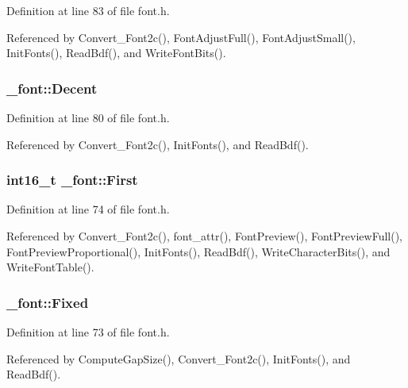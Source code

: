 Definition at line 83 of file font.\-h.



Referenced by Convert\-\_\-\-Font2c(), Font\-Adjust\-Full(), Font\-Adjust\-Small(), Init\-Fonts(), Read\-Bdf(), and Write\-Font\-Bits().

\hypertarget{struct__font_a7f3567884a6aa454b7414b10dba35755}{
\subsubsection[{Decent}]{ \-\_\-font\-::\-Decent}}\label{struct__font_a7f3567884a6aa454b7414b10dba35755}


Definition at line 80 of file font.\-h.



Referenced by Convert\-\_\-\-Font2c(), Init\-Fonts(), and Read\-Bdf().

\hypertarget{struct__font_a73decb2a2c2880dc782cd9cda5561876}{
\subsubsection[{First}]{\setlength{\rightskip}{0pt plus 5cm}int16\-\_\-t \-\_\-font\-::\-First}}\label{struct__font_a73decb2a2c2880dc782cd9cda5561876}


Definition at line 74 of file font.\-h.



Referenced by Convert\-\_\-\-Font2c(), font\-\_\-attr(), Font\-Preview(), Font\-Preview\-Full(), Font\-Preview\-Proportional(), Init\-Fonts(), Read\-Bdf(), Write\-Character\-Bits(), and Write\-Font\-Table().

\hypertarget{struct__font_a76218c6b35acb78926429f247cbaa687}{
\subsubsection[{Fixed}]{ \-\_\-font\-::\-Fixed}}\label{struct__font_a76218c6b35acb78926429f247cbaa687}


Definition at line 73 of file font.\-h.



Referenced by Compute\-Gap\-Size(), Convert\-\_\-\-Font2c(), Init\-Fonts(), and Read\-Bdf().


